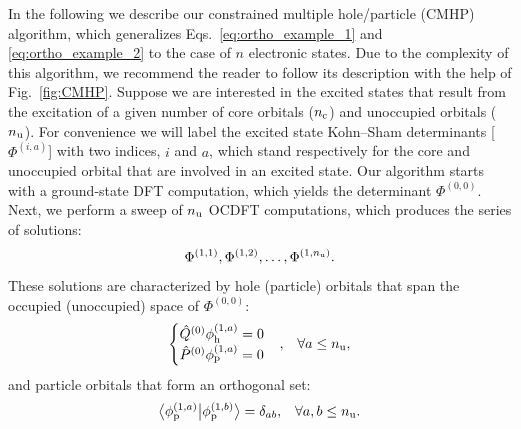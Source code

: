 \documentclass[12pt]{article}
\newcommand{\braket}[3][0]
{\ifthenelse{\equal{#1}{0}}{\left\langle #2 \middle| #3 \right\rangle}
{\ifthenelse{\equal{#1}{1}}{\big\langle #2 \big| #3 \big\rangle}
{\ifthenelse{\equal{#1}{2}}{\Big\langle #2 \Big| #3 \Big\rangle}
{\ifthenelse{\equal{#1}{3}}{\bigg\langle #2 \bigg| #3 \bigg\rangle}
{\ifthenelse{\equal{#1}{4}}{\Bigg\langle #2 \Bigg| #3 \Bigg\rangle}
{Error}}}}}
}
\begin{document}
In the following we describe our constrained multiple hole/particle (CMHP) algorithm, which generalizes Eqs.~\eqref{eq:ortho_example_1} and \eqref{eq:ortho_example_2} to the case of $n$ electronic states.  Due to the complexity of this algorithm, we recommend the reader to follow its description with the help of Fig.~\ref{fig:CMHP}.
Suppose we are interested in the excited states that result from the excitation of a given number of core orbitals ($n_{\rm c}$) and unoccupied orbitals ($n_{\rm u}$).
For convenience we will label the excited state Kohn--Sham determinants [$\Phi^{(i,a)}$] with two indices, $i$ and $a$, which stand respectively for the core and unoccupied orbital that are involved in an excited state.
Our algorithm starts with a ground-state DFT computation, which yields the determinant $\Phi^{(0,0)}$.
Next, we perform a sweep of $n_{\rm u}$ OCDFT computations, which produces the series of solutions:
\begin{equation}
\Phi^{(1,1)}, \Phi^{(1,2)}, \ldots, \Phi^{(1,n_{\rm u})}.
\end{equation}
These solutions are characterized by hole (particle) orbitals that span the occupied (unoccupied) space of $\Phi^{(0,0)}$:
\begin{align}
\begin{cases}
\hat{Q}^{(0)}\phi_{\rm h}^{(1,a)}= 0\\
\hat{P}^{(0)}\phi_{\rm p}^{(1,a)}= 0
\end{cases} &,&\forall a \leq n_{\rm u},
\end{align}
and particle orbitals that form an orthogonal set:
\begin{align}
\braket[1]{\phi^{(1,a)}_{\rm p}}{\phi^{(1,b)}_{\rm p}} &= \delta_{ab}, &\forall a,b \leq n_{\rm u}.
\end{align}
\end{document}
